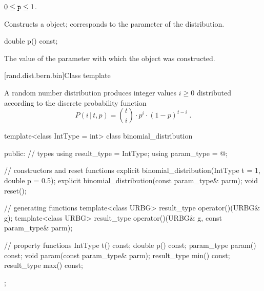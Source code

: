 \begin{itemdescr}
\pnum\requires
 $0 \leq \texttt{p} \leq 1$.

\pnum\effects Constructs a  object;
 corresponds to the parameter of the distribution.
\end{itemdescr}

%
\begin{itemdecl}
double p() const;
\end{itemdecl}

\begin{itemdescr}
\pnum\returns The value of the  parameter
 with which the object was constructed.
\end{itemdescr}


[rand.dist.bern.bin]{Class template }%
%
%

\pnum
A  random number distribution
produces integer values $i \geq 0$
distributed according to
the discrete probability function%
%
%
\[%
 P(i\,|\,t,p)
      = \binom{t}{i} \cdot p^i \cdot (1-p)^{t-i}
\; \mbox{.}
\]

%
\begin{codeblock}
template<class IntType = int>
  class binomial_distribution {
  public:
    // types
    using result_type = IntType;
    using param_type  = @\unspec@;

    // constructors and reset functions
    explicit binomial_distribution(IntType t = 1, double p = 0.5);
    explicit binomial_distribution(const param_type& parm);
    void reset();

    // generating functions
    template<class URBG>
      result_type operator()(URBG& g);
    template<class URBG>
      result_type operator()(URBG& g, const param_type& parm);

    // property functions
    IntType t() const;
    double p() const;
    param_type param() const;
    void param(const param_type& parm);
    result_type min() const;
    result_type max() const;
  };
\end{codeblock}


